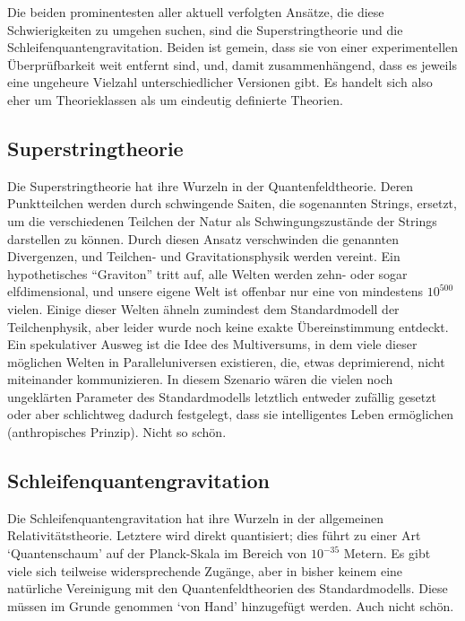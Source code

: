 \documentclass{scrartcl}
\begin{document}
Die beiden prominentesten aller aktuell verfolgten Ansätze, die diese Schwierigkeiten zu umgehen suchen, sind die Superstringtheorie und die Schleifenquantengravitation. Beiden ist gemein, dass sie von einer experimentellen Überprüfbarkeit weit entfernt sind, und, damit zusammenhängend, dass es jeweils eine ungeheure Vielzahl unterschiedlicher Versionen gibt. Es handelt sich also eher um Theorieklassen als um eindeutig definierte Theorien.


\subsection*{Superstringtheorie}

Die Superstringtheorie hat ihre Wurzeln in der Quantenfeldtheorie. Deren Punktteilchen werden durch schwingende Saiten, die sogenannten Strings, ersetzt, um die verschiedenen Teilchen der Natur als Schwingungszustände der Strings darstellen zu können. Durch diesen Ansatz verschwinden die genannten Divergenzen, und Teilchen- und Gravitationsphysik werden vereint. Ein hypothetisches \enquote{Graviton} tritt auf, alle Welten werden zehn- oder sogar elfdimensional, und unsere eigene Welt ist offenbar nur eine von mindestens $10^{500}$ vielen. Einige dieser Welten ähneln zumindest dem Standardmodell der Teilchenphysik, aber leider wurde noch keine exakte Übereinstimmung entdeckt. Ein spekulativer Ausweg ist die Idee des Multiversums, in dem viele dieser möglichen Welten in Paralleluniversen existieren, die, etwas deprimierend, nicht miteinander kommunizieren. In diesem Szenario wären die vielen noch ungeklärten Parameter des Standardmodells letztlich entweder zufällig gesetzt oder aber schlichtweg dadurch festgelegt, dass sie intelligentes Leben ermöglichen (anthropisches Prinzip). Nicht so schön.


\subsection*{Schleifenquantengravitation}

Die Schleifenquantengravitation hat ihre Wurzeln in der allgemeinen Relativitätstheorie. Letztere wird direkt quantisiert; dies führt zu einer Art \enquote*{Quantenschaum} auf der Planck-Skala im Bereich von $10^{-35}$ Metern. Es gibt viele sich teilweise widersprechende Zugänge, aber in bisher keinem eine natürliche Vereinigung mit den Quantenfeldtheorien des Standardmodells. Diese müssen im Grunde genommen \enquote*{von Hand} hinzugefügt werden. Auch nicht schön.
\end{document}
